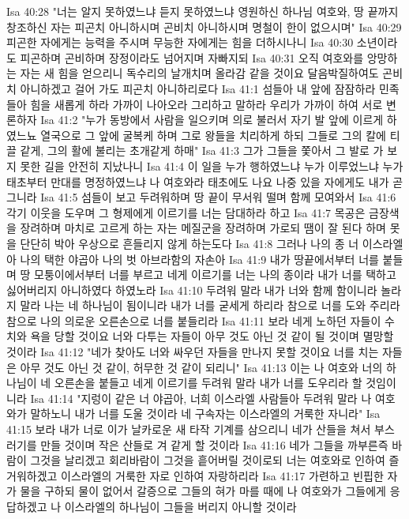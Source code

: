 Isa 40:28  "너는 알지 못하였느냐 듣지 못하였느냐 영원하신 하나님 여호와, 땅 끝까지 창조하신 자는 피곤치 아니하시며 곤비치 아니하시며 명철이 한이 없으시며"
Isa 40:29  피곤한 자에게는 능력을 주시며 무능한 자에게는 힘을 더하시나니
Isa 40:30  소년이라도 피곤하며 곤비하며 장정이라도 넘어지며 자빠지되
Isa 40:31  오직 여호와를 앙망하는 자는 새 힘을 얻으리니 독수리의 날개치며 올라감 같을 것이요 달음박질하여도 곤비치 아니하겠고 걸어 가도 피곤치 아니하리로다
Isa 41:1  섬들아 내 앞에 잠잠하라 민족들아 힘을 새롭게 하라 가까이 나아오라 그리하고 말하라 우리가 가까이 하여 서로 변론하자
Isa 41:2  "누가 동방에서 사람을 일으키며 의로 불러서 자기 발 앞에 이르게 하였느뇨 열국으로 그 앞에 굴복케 하며 그로 왕들을 치리하게 하되 그들로 그의 칼에 티끌 같게, 그의 활에 불리는 초개같게 하매"
Isa 41:3  그가 그들을 쫓아서 그 발로 가 보지 못한 길을 안전히 지났나니
Isa 41:4  이 일을 누가 행하였느냐 누가 이루었느냐 누가 태초부터 만대를 명정하였느냐 나 여호와라 태초에도 나요 나중 있을 자에게도 내가 곧 그니라
Isa 41:5  섬들이 보고 두려워하며 땅 끝이 무서워 떨며 함께 모여와서
Isa 41:6  각기 이웃을 도우며 그 형제에게 이르기를 너는 담대하라 하고
Isa 41:7  목공은 금장색을 장려하며 마치로 고르게 하는 자는 메질군을 장려하며 가로되 땜이 잘 된다 하며 못을 단단히 박아 우상으로 흔들리지 않게 하는도다
Isa 41:8  그러나 나의 종 너 이스라엘아 나의 택한 야곱아 나의 벗 아브라함의 자손아
Isa 41:9  내가 땅끝에서부터 너를 붙들며 땅 모퉁이에서부터 너를 부르고 네게 이르기를 너는 나의 종이라 내가 너를 택하고 싫어버리지 아니하였다 하였노라
Isa 41:10  두려워 말라 내가 너와 함께 함이니라 놀라지 말라 나는 네 하나님이 됨이니라 내가 너를 굳세게 하리라 참으로 너를 도와 주리라 참으로 나의 의로운 오른손으로 너를 붙들리라
Isa 41:11  보라 네게 노하던 자들이 수치와 욕을 당할 것이요 너와 다투는 자들이 아무 것도 아닌 것 같이 될 것이며 멸망할 것이라
Isa 41:12  "네가 찾아도 너와 싸우던 자들을 만나지 못할 것이요 너를 치는 자들은 아무 것도 아닌 것 같이, 허무한 것 같이 되리니"
Isa 41:13  이는 나 여호와 너의 하나님이 네 오른손을 붙들고 네게 이르기를 두려워 말라 내가 너를 도우리라 할 것임이니라
Isa 41:14  "지렁이 같은 너 야곱아, 너희 이스라엘 사람들아 두려워 말라 나 여호와가 말하노니 내가 너를 도울 것이라 네 구속자는 이스라엘의 거룩한 자니라"
Isa 41:15  보라 내가 너로 이가 날카로운 새 타작 기계를 삼으리니 네가 산들을 쳐서 부스러기를 만들 것이며 작은 산들로 겨 같게 할 것이라
Isa 41:16  네가 그들을 까부른즉 바람이 그것을 날리겠고 회리바람이 그것을 흩어버릴 것이로되 너는 여호와로 인하여 즐거워하겠고 이스라엘의 거룩한 자로 인하여 자랑하리라
Isa 41:17  가련하고 빈핍한 자가 물을 구하되 물이 없어서 갈증으로 그들의 혀가 마를 때에 나 여호와가 그들에게 응답하겠고 나 이스라엘의 하나님이 그들을 버리지 아니할 것이라
